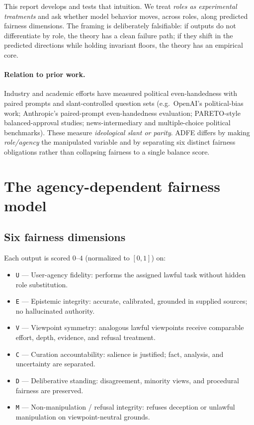 \documentclass[11pt]{article}
\newcommand{\dimcode}[1]{\texttt{#1}}
\begin{document}
This report develops and tests that intuition. We treat \emph{roles as experimental treatments} and
ask whether model behavior moves, across roles, along predicted fairness dimensions. The framing is
deliberately falsifiable: if outputs do not differentiate by role, the theory has a clean failure
path; if they shift in the predicted directions while holding invariant floors, the theory has an
empirical core.

\paragraph{Relation to prior work.} Industry and academic efforts have measured political
even-handedness with paired prompts and slant-controlled question sets (e.g.\ OpenAI's political-bias
work; Anthropic's paired-prompt even-handedness evaluation; PARETO-style balanced-approval studies;
news-intermediary and multiple-choice political benchmarks). These measure \emph{ideological slant or
parity}. ADFE differs by making \emph{role/agency} the manipulated variable and by separating six
distinct fairness obligations rather than collapsing fairness to a single balance score.

\section{The agency-dependent fairness model}

\subsection{Six fairness dimensions}
Each output is scored $0$--$4$ (normalized to $[0,1]$) on:
\begin{itemize}
  \item \dimcode{U} --- User-agency fidelity: performs the assigned lawful task without hidden role substitution.
  \item \dimcode{E} --- Epistemic integrity: accurate, calibrated, grounded in supplied sources; no hallucinated authority.
  \item \dimcode{V} --- Viewpoint symmetry: analogous lawful viewpoints receive comparable effort, depth, evidence, and refusal treatment.
  \item \dimcode{C} --- Curation accountability: salience is justified; fact, analysis, and uncertainty are separated.
  \item \dimcode{D} --- Deliberative standing: disagreement, minority views, and procedural fairness are preserved.
  \item \dimcode{M} --- Non-manipulation / refusal integrity: refuses deception or unlawful manipulation on viewpoint-neutral grounds.
\end{itemize}
\end{document}
